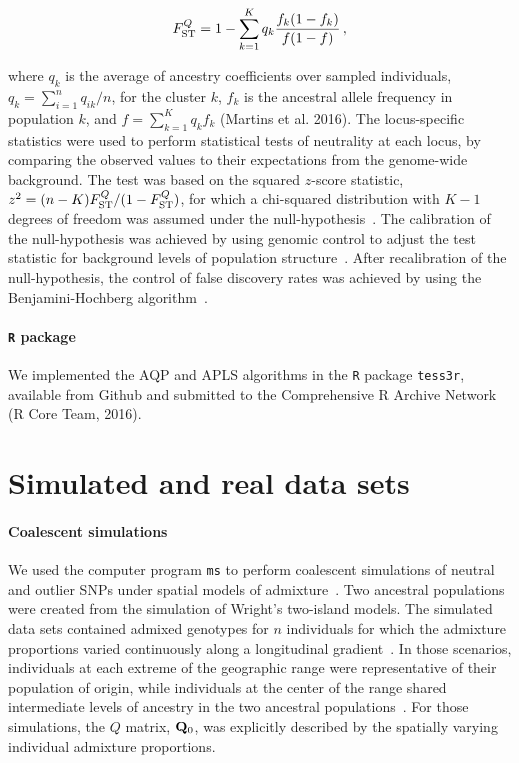 $$
F^{Q}_{\rm ST} = 1 - \sum_{k=1}^K  q_k \frac{f_k (1-f_k)}{f(1-f)} \, ,
$$

\noindent where $q_k$ is the average of ancestry coefficients over sampled individuals, $q_k = \sum_{i =1}^n q_{ik}/n$, for the cluster $k$, $f_k$ is the ancestral allele frequency in population $k$, and $f = \sum_{k = 1}^K q_k f_k$ (Martins et al. 2016). The locus-specific statistics were used to perform statistical tests of neutrality at each locus, by comparing the observed values to their expectations from the genome-wide background. The test was based on the squared $z$-score statistic, $z^2 = (n-K) F^{Q}_{\rm ST}/(1 - F^{Q}_{\rm ST})$, for which a  chi-squared distribution with $K-1$ degrees of freedom was assumed under the null-hypothesis~\citep{Martins2016}. The calibration of the null-hypothesis was achieved by using genomic control to adjust the test statistic for background levels of population structure~\citep{Devlin1999, Francois2016}. After recalibration of the null-hypothesis, the control of false discovery rates was achieved by using the Benjamini-Hochberg algorithm~\citep{Benjamini1995}.


\paragraph{{\tt R} package} We implemented the AQP and APLS algorithms in the {\tt R} package {\tt tess3r}, available from Github and submitted to the Comprehensive R Archive Network (R Core Team, 2016).  


\section{Simulated and real data sets}
\paragraph{Coalescent simulations} We used the computer program {\tt ms} to perform coalescent simulations of neutral and outlier SNPs under spatial models of admixture~\citep{Hudson2002}. Two ancestral populations were created from the simulation of Wright\rq{}s two-island models. The simulated data sets contained admixed genotypes for $n$ individuals for which the admixture proportions varied continuously along a longitudinal gradient~\citep{Durand2009, Francois2010}. In those scenarios, individuals at each extreme of the geographic range were representative of their population of origin, while individuals at the center of the range shared intermediate levels of ancestry in the two ancestral populations~\citep{Caye2016}. For those simulations, the $Q$ matrix, ${\bf Q}_0$, was explicitly described by the spatially varying individual admixture proportions.


